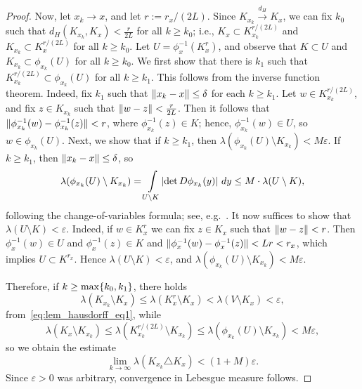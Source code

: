 \documentclass[11pt,onecolumn]{IEEEtran}  %
\newcommand{\hto}{\xrightarrow{d_H}}
\newcommand{\defeq}{:=}%
\DeclarePairedDelimiter{\set}{\{}{\}}
\DeclarePairedDelimiter{\abs}{|}{|}
\DeclarePairedDelimiter{\norm}{\|}{\|}
\theoremstyle{definition}
\begin{document}
\begin{proof}
    Now, let $x_k \to x$, and let $r \defeq r_x / (2L)$. Since $K_{x_k} \hto K_x$, we can fix $k_0$ such that $d_H(K_{x_k}, K_x) < \frac{r}{2L}$ for all $k \geq k_0$; i.e., $K_x \subset K_{x_k}^{r/(2L)}$ and $K_{x_k} \subset K_{x}^{r/(2L)}$ for all $k \geq k_0$. Let $U = \phi_x^{-1}(K_x^r)$, and observe that $K \subset U$ and $K_{x_k} \subset \phi_{x_k}(U)$ for all $k \geq k_0$. We first show that there is $k_1$ such that $K_{x_k}^{r/(2L)} \subset \phi_{x_k}(U)$ for all $k \geq k_1$. This follows from the inverse function theorem. Indeed, fix $k_1$ such that $\norm{x_k - x} \leq \delta$ for each $k \geq k_1$. Let $w \in K_{x_k}^{r/(2L)}$, and fix $z \in K_{x_k}$ such that $\norm{w-z} < \frac{r}{2L}$. Then it follows that $\norm{\phi_{x_k}^{-1}(w) - \phi_{x_k}^{-1}(z)} < r$, where $\phi_{x_k}^{-1}(z) \in K$; hence, $\phi_{x_k}^{-1}(w) \in U$, so $w \in \phi_{x_k}(U)$. Next, we show that if $k \geq k_1$, then $\lambda(\phi_{x_k}(U) \setminus K_{x_k}) < M\varepsilon$. If $k \geq k_1$, then $\norm{x_k - x} \leq \delta$, so
    \begin{equation*}
        \lambda( \phi_{x_k}(U) \setminus K_{x_k}) = \int\limits_{U \setminus K} \abs{\det D \phi_{x_k}(y)} \ dy \leq M \cdot \lambda(U \setminus K),
    \end{equation*}
    following the change-of-variables formula; see, e.g.~\cite[Theorem 7.26]{walter_rudin_1966}.
    It now suffices to show that $\lambda(U \setminus K) < \varepsilon$. Indeed, if $w \in K_x^r$ we can fix $z \in K_x$ such that $\norm{w-z} < r$. Then $\phi_x^{-1}(w) \in U$ and $\phi_x^{-1}(z) \in K$ and $\norm{\phi_x^{-1}(w) - \phi_x^{-1}(z)} < L r < r_x$, which implies $U \subset K^{r_x}$. Hence $\lambda(U \setminus K) < \varepsilon$, and $\lambda(\phi_{x_k}(U) \setminus K_{x_k}) < M\varepsilon$.

    Therefore, if $k \geq \max\set{k_0,k_1}$, there holds
    \begin{equation*}
        \lambda(K_{x_k} \setminus K_x) \leq \lambda(K_x^r \setminus K_x) < \lambda(V \setminus K_x) < \varepsilon,
    \end{equation*}
    from~\eqref{eq:lem_hausdorff_eq1},  while
    \begin{equation*}
        \lambda(K_x \setminus K_{x_k}) \leq \lambda(K_{x_k}^{r/(2L)} \setminus K_{x_k}) \leq \lambda(\phi_{x_k}(U) \setminus K_{x_k}) < M\varepsilon,
    \end{equation*}
    so we obtain the estimate
    \begin{equation*}
        \lim_{k \to \infty} \lambda(K_{x_k} \triangle K_x) < (1+M)\varepsilon.
    \end{equation*}
    Since $\varepsilon > 0$ was arbitrary, convergence in Lebesgue measure follows.
\end{proof}
\end{document}
